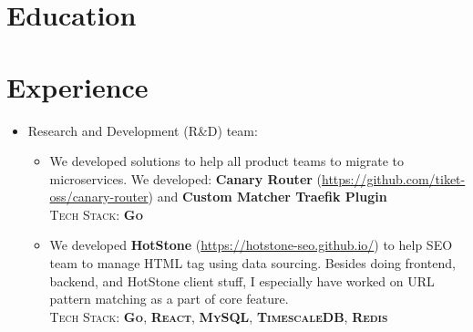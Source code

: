 \documentclass[11pt,a4paper,sans]{moderncv} %
\begin{document}
\makecvtitle %


\section{Education}





\section{Experience}

{
\begin{itemize}
  \item Research and Development (R\&D) team:
    \begin{itemize}
      \item We developed solutions to help all product teams to migrate to microservices. We developed: \textbf{Canary Router} (\url{https://github.com/tiket-oss/canary-router}) and \textbf{Custom Matcher Traefik Plugin} 
\\ \textsc{Tech Stack: \textbf{Go}}
      \item We developed \textbf{HotStone} (\url{https://hotstone-seo.github.io/}) to help SEO team to manage HTML tag using data sourcing. Besides doing frontend, backend, and HotStone client stuff, I especially have worked on URL pattern matching as a part of core feature.
      \\ \textsc{Tech Stack: \textbf{Go}, \textbf{React}, \textbf{MySQL}, \textbf{TimescaleDB}, \textbf{Redis}}
    \end{itemize}
\end{itemize}
}
\end{document}
